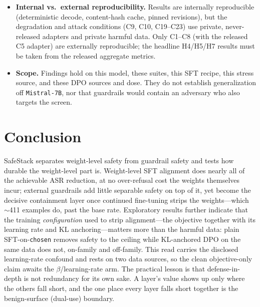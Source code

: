 \documentclass[11pt,a4paper]{article}
\newcommand{\code}[1]{\texttt{#1}}
\newcommand{\approxs}{$\sim$}
\begin{document}
\begin{itemize}[leftmargin=1.4em,itemsep=2pt]
  difference and overlapping CIs as ``not separable''; the latter is absence of evidence, not a
  positive equivalence test, and no power analysis or equivalence test backs the null and
  redundancy reads (guardrails ``redundant'' on the aligned model, H3, H6).
  \item \textbf{Internal vs.\ external reproducibility.} Results are internally reproducible
  (deterministic decode, content-hash cache, pinned revisions), but the degradation and attack
  conditions (C9, C10, C19--C23) use private, never-released adapters and private harmful data.
  Only C1--C8 (with the released C5 adapter) are externally reproducible; the headline H4/H5/H7
  results must be taken from the released aggregate metrics.
  \item \textbf{Scope.} Findings hold on this model, these suites, this SFT recipe, this stress
  source, and these DPO sources and dose. They do not establish generalization off
  \code{Mistral-7B}, nor that guardrails would contain an adversary who also targets the screen.
\end{itemize}

\section{Conclusion}

SafeStack separates weight-level safety from guardrail safety and tests how durable the
weight-level part is. Weight-level SFT alignment does nearly all of the achievable ASR
reduction, at no over-refusal cost the weights themselves incur; external guardrails add little
separable safety on top of it, yet become the decisive containment layer once continued
fine-tuning strips the weights---which \approxs{}411 examples do, past the base rate.
Exploratory results further indicate that the training \emph{configuration} used to strip
alignment---the objective together with its learning rate and KL anchoring---matters more than
the harmful data: plain SFT-on-\code{chosen} removes safety to the ceiling while KL-anchored
DPO on the same data does not, on-family and off-family. This read carries the disclosed
learning-rate confound and rests on two data sources, so the clean objective-only claim awaits
the $\beta$/learning-rate arm. The practical lesson is that defense-in-depth is not redundancy
for its own sake. A layer's value shows up only where the others fall short, and the one place
every layer falls short together is the benign-surface (dual-use) boundary.

\appendix
\end{document}
